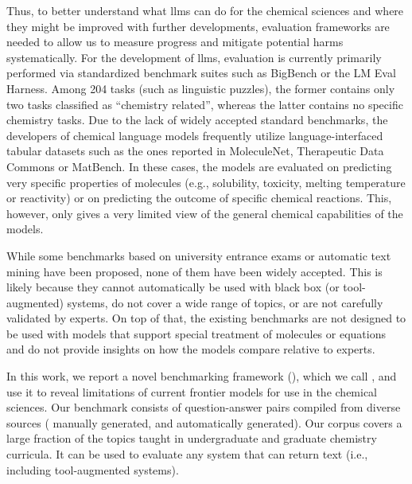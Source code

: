 \documentclass[11pt, oneside]{article}
\begin{document}
\begin{refsection}
Thus, to better understand what \glspl{llm} can do for the chemical sciences and where they might be improved with further developments, evaluation frameworks are needed to allow us to measure progress and mitigate potential harms systematically.
For the development of \glspl{llm}, evaluation is currently primarily performed via standardized benchmark suites such as BigBench\autocite{srivastava2022beyond} or the LM Eval Harness.\autocite{eval-harness}
Among 204 tasks (such as linguistic puzzles), the former contains only two tasks classified as \enquote{chemistry related}, whereas the latter contains no specific chemistry tasks.
Due to the lack of widely accepted standard benchmarks, the developers of chemical language models\autocite{jablonka2024leveraging, guo2023large, ahmad2022chemberta2, Cai_2024, frey2023neural} frequently utilize language-interfaced\autocite{dinh2022lift} tabular datasets such as the ones reported in MoleculeNet,\autocite{wu2018moleculenet} Therapeutic Data Commons\autocite{huang2021therapeutics} or MatBench.\autocite{Dunn_2020}
In these cases, the models are evaluated on predicting very specific properties of molecules (e.g., solubility, toxicity, melting temperature or reactivity) or on predicting the outcome of specific chemical reactions.
This, however, only gives a very limited view of the general chemical capabilities of the models.

While some benchmarks based on university entrance exams\autocite{Zaki_2024, arora2023llms} or automatic text mining\autocite{song2023honeybee, wei2021chemistryqa, song-etal-2023-matsci} have been proposed, none of them have been widely accepted.
This is likely because they cannot automatically be used with black box (or tool-augmented) systems, do not cover a wide range of topics, or are not carefully validated by experts.
On top of that, the existing benchmarks are not designed to be used with models that support special treatment of molecules or equations and do not provide insights on how the models compare relative to experts.

In this work, we report a novel benchmarking framework  (), which we call \chembench, and use it to reveal limitations of current frontier models for use in the chemical sciences.
Our benchmark consists of \xspace question-answer pairs compiled from diverse sources (\xspace manually generated, and \xspace automatically generated).  
Our corpus covers a large fraction of the topics taught in undergraduate and graduate chemistry curricula. It can be used to evaluate any system that can return text (i.e., including tool-augmented systems).


\end{refsection}
\end{document}
